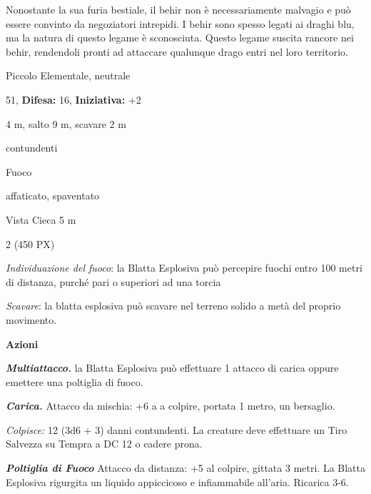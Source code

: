 \begin{multicols}{2}
{Nonostante la sua furia bestiale, il behir non è necessariamente malvagio e può essere convinto da negoziatori intrepidi. I behir sono spesso legati ai draghi blu, ma la natura di questo legame è sconosciuta. Questo legame suscita rancore nei behir, rendendoli pronti ad attaccare qualunque drago entri nel loro territorio.

\noindent
\begin{description}[noitemsep, topsep=0pt, parsep=0pt, partopsep=0pt, leftmargin=0cm, labelwidth=2.2cm]
	\item[\textbf{Taglia/Tipo:}] Piccolo Elementale, neutrale
	\item[\textbf{Caratt.:}] 
	\item[\textbf{Punti Ferita:}] 51,  \textbf{Difesa:} 16,  \textbf{Iniziativa:} +2
	\item[\textbf{Movimento:}] 4 m, salto 9 m, scavare 2 m
	\item[\textbf{Tiri Salvez.:}] 
	\item[\textbf{Res. Danni:}] contundenti
	\item[\textbf{Imm. Danni:}] Fuoco
	\item[\textbf{Immunità:}] affaticato, spaventato
	\item[\textbf{Sensi:}] Vista Cieca 5 m
	\item[\textbf{Sfida:}] 2 (450 PX)\smallskip
\end{description}

\emph{Individuazione del fuoco}: la Blatta Esplosiva può percepire fuochi entro 100 metri di distanza, purché pari o superiori ad una torcia

\emph{Scavare}: la blatta esplosiva può scavare nel terreno solido a metà del proprio movimento.

\textbf{Azioni}

\emph{\textbf{Multiattacco.}} la Blatta Esplosiva può effettuare 1 attacco di carica oppure emettere una poltiglia di fuoco.

\emph{\textbf{Carica.}} Attacco da mischia: +6 a a colpire, portata 1 metro, un bersaglio.

\emph{Colpisce:} 12 (3d6 + 3) danni contundenti. La creature deve effettuare un Tiro Salvezza su Tempra a DC 12 o cadere prona.

\emph{\textbf{Poltiglia di Fuoco}} Attacco da distanza: +5 al colpire, gittata 3 metri. La Blatta Esplosiva rigurgita un liquido appiccicoso e infiammabile all'aria. Ricarica 3-6.

}
\end{multicols}
